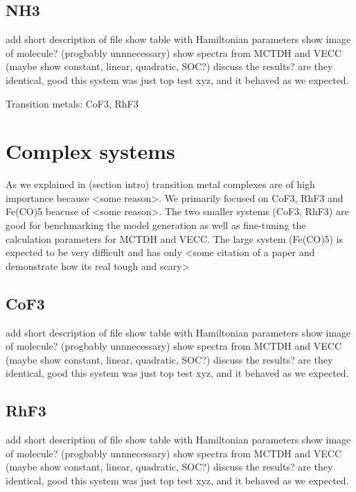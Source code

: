 \documentclass[letterpaper, 12pt, oneside]{report}
\begin{document}
\subsection{NH3}
add short description of file
show table with Hamiltonian parameters
show image of molecule? (progbably unnnecessary)
show spectra from MCTDH and VECC (maybe show constant, linear, quadratic, SOC?)
discuss the results? are they identical, good this system was just top test xyz, and it behaved as we expected.


Transition metals: CoF3, RhF3

\section{Complex systems}
As we explained in (section intro) transition metal complexes are of high importance because <some reason>.
We primarily focused on CoF3, RhF3 and Fe(CO)5 beacuse of <some reason>.
The two smaller systems (CoF3, RhF3) are good for benchmarking the model generation as well as fine-tuning the calculation parameters for MCTDH and VECC.
The large system (Fe(CO)5) is expected to be very difficult and has only <some citation of a paper and demonstrate how its real tough and scary>


\subsection{CoF3}
add short description of file
show table with Hamiltonian parameters
show image of molecule? (progbably unnnecessary)
show spectra from MCTDH and VECC (maybe show constant, linear, quadratic, SOC?)
discuss the results? are they identical, good this system was just top test xyz, and it behaved as we expected.

\subsection{RhF3}
add short description of file
show table with Hamiltonian parameters
show image of molecule? (progbably unnnecessary)
show spectra from MCTDH and VECC (maybe show constant, linear, quadratic, SOC?)
discuss the results? are they identical, good this system was just top test xyz, and it behaved as we expected.
\end{document}
